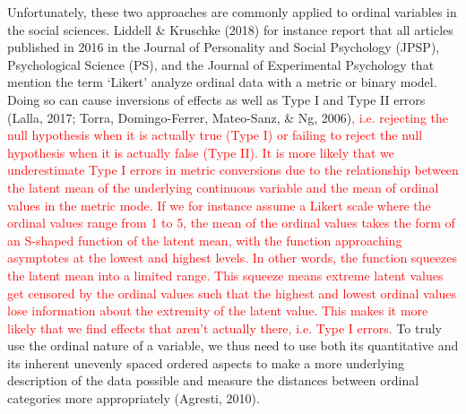 \documentclass[12pt,econ]{sources/authesis}
\begin{document}
Unfortunately, these two approaches are commonly applied to ordinal variables in the social sciences. Liddell \& Kruschke (2018) for instance report that all articles published in 2016 in the Journal of Personality and Social Psychology (JPSP), Psychological Science (PS), and the Journal of Experimental Psychology that mention the term `Likert' analyze ordinal data with a metric or binary model. Doing so can cause inversions of effects as well as Type I and Type II errors (Lalla, 2017; Torra, Domingo-Ferrer, Mateo-Sanz, \& Ng, 2006)\textcolor{red}{, i.e. rejecting the null hypothesis when it is actually true (Type I) or failing to reject the null hypothesis when it is actually false (Type II). It is more likely that we underestimate Type I errors in metric conversions due to the relationship between the latent mean of the underlying continuous variable and the mean of ordinal values in the metric mode. If we for instance assume a Likert scale where the ordinal values range from 1 to 5, the mean of the ordinal values takes the form of an S-shaped function of the latent mean, with the function approaching asymptotes at the lowest and highest levels. In other words, the function squeezes the latent mean into a limited range. This squeeze means extreme latent values get censored by the ordinal values such that the highest and lowest ordinal values lose information about the extremity of the latent value. This makes it more likely that we find effects that aren't actually there, i.e. Type I errors.} To truly use the ordinal nature of a variable, we thus need to use both its quantitative and its inherent unevenly spaced ordered aspects to make a more underlying description of the data possible and measure the distances between ordinal categories more appropriately (Agresti, 2010).
\end{document}
